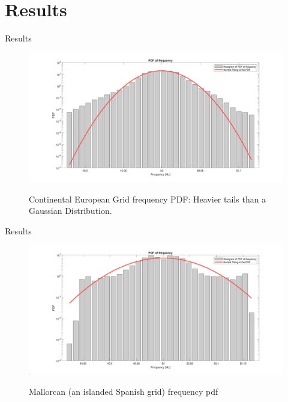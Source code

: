 \section[Results]{Results}
\label{sec:results}

\begin{frame}{Results}
	\begin{figure}
		\centering
		\includegraphics[scale=0.15]{../figures/pdf/pdf_frequency_rte_2019_09.png}
		\label{fig:pdf_rte2019}
		\caption{Continental European Grid frequency PDF: Heavier tails than a Gaussian Distribution.}
	\end{figure}
\end{frame}

\begin{frame}{Results}
	\begin{figure}
		\centering
		\includegraphics[scale=0.15]{../figures/pdf/pdf_frequency_spain_mallorca_2019_05_f1}
		\label{fig:pdf_spainMallorca}
		\caption{Mallorcan (an islanded Spanish grid) frequency pdf}
	\end{figure}
\end{frame}

